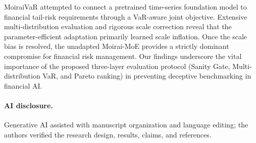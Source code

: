 \documentclass[runningheads]{llncs}
\begin{document}
MoiraiVaR attempted to connect a pretrained time-series foundation model to financial tail-risk requirements through a VaR-aware joint objective. Extensive multi-distribution evaluation and rigorous scale correction reveal that the parameter-efficient adaptation primarily learned scale inflation. Once the scale bias is resolved, the unadapted Moirai-MoE provides a strictly dominant compromise for financial risk management. Our findings underscore the vital importance of the proposed three-layer evaluation protocol (Sanity Gate, Multi-distribution VaR, and Pareto ranking) in preventing deceptive benchmarking in financial AI.

\paragraph{AI disclosure.}
Generative AI assisted with manuscript organization and language editing; the
authors verified the research design, results, claims, and references.
\end{document}
